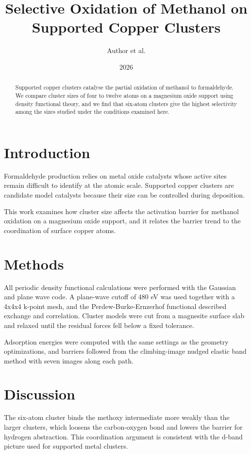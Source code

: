 \documentclass[12pt]{article}
\title{Selective Oxidation of Methanol on Supported Copper Clusters}
\author{Author et al.}
\date{2026}
\begin{document}
\maketitle

\begin{abstract}
Supported copper clusters catalyse the partial oxidation of methanol to formaldehyde.
We compare cluster sizes of four to twelve atoms on a magnesium oxide support using density
functional theory, and we find that six-atom clusters give the highest selectivity among the
sizes studied under the conditions examined here.
\end{abstract}

\section{Introduction}

Formaldehyde production relies on metal oxide catalysts whose active sites remain difficult to
identify at the atomic scale. Supported copper clusters are candidate model catalysts because
their size can be controlled during deposition.

This work examines how cluster size affects the activation barrier for methanol oxidation on a
magnesium oxide support, and it relates the barrier trend to the coordination of surface copper
atoms.

\section{Methods}

All periodic density functional calculations were performed with the Gaussian and plane wave
code. A plane-wave cutoff of 480 eV was used together with a 4x4x4 k-point mesh, and the
Perdew-Burke-Ernzerhof functional described exchange and correlation. Cluster models were cut
from a magnesite surface slab and relaxed until the residual forces fell below a fixed
tolerance.

Adsorption energies were computed with the same settings as the geometry optimizations, and
barriers followed from the climbing-image nudged elastic band method with seven images along
each path.

\section{Discussion}

The six-atom cluster binds the methoxy intermediate more weakly than the larger clusters, which
loosens the carbon-oxygen bond and lowers the barrier for hydrogen abstraction. This
coordination argument is consistent with the d-band picture used for supported metal clusters.
\end{document}
